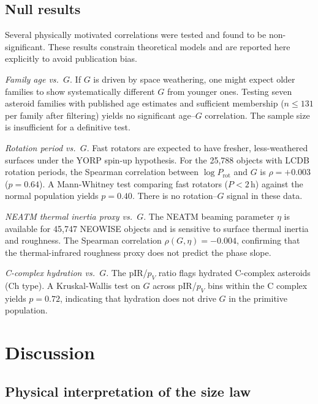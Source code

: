 \documentclass{aa}
\begin{document}
\subsection{Null results}
\label{sec:nullresults}

Several physically motivated correlations were tested and found to be
non-significant.  These results constrain theoretical models and are
reported here explicitly to avoid publication bias.

\textit{Family age vs.\ $G$}.  If $G$ is driven by space weathering, one
might expect older families to show systematically different $G$ from
younger ones.  Testing seven asteroid families with published age estimates
\citep{spoto2015} and sufficient membership ($n \leq 131$ per family after
filtering) yields no significant age–$G$ correlation.  The sample size is
insufficient for a definitive test.

\textit{Rotation period vs.\ $G$}.  Fast rotators are expected to have
fresher, less-weathered surfaces under the YORP spin-up hypothesis.  For
the 25,788 objects with LCDB rotation periods, the Spearman correlation
between $\log P_\mathrm{rot}$ and $G$ is $\rho = +0.003$ ($p = 0.64$).
A Mann-Whitney test comparing fast rotators ($P < 2$\,h) against the
normal population yields $p = 0.40$.  There is no rotation–$G$ signal in
these data.

\textit{NEATM thermal inertia proxy vs.\ $G$}.  The NEATM beaming
parameter $\eta$ is available for 45,747 NEOWISE objects and is sensitive
to surface thermal inertia and roughness.  The Spearman correlation
$\rho(G, \eta) = -0.004$, confirming that the thermal-infrared roughness
proxy does not predict the phase slope.

\textit{C-complex hydration vs.\ $G$}.  The pIR/$p_V$ ratio flags
hydrated C-complex asteroids (Ch type).  A Kruskal-Wallis test on $G$
across pIR/$p_V$ bins within the C complex yields $p = 0.72$, indicating
that hydration does not drive $G$ in the primitive population.


\section{Discussion}
\label{sec:discussion}

\subsection{Physical interpretation of the size law}
\label{sec:discuss_sizelaw}
\end{document}
